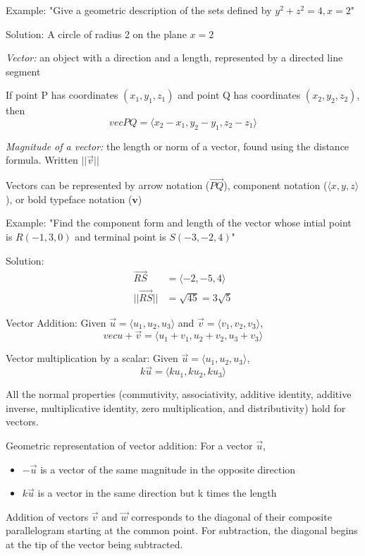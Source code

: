 \documentclass[12pt]{article}
\begin{document}
Example:
"Give a geometric description of the sets defined by $y^2 + z^2 = 4, x = 2$"

Solution:
A circle of radius 2 on the plane $x = 2$

\emph{Vector:} an object with a direction and a length, represented by a directed line segment

If point P has coordinates $(x_1, y_1, z_1)$ and point Q has coordinates $(x_2, y_2, z_2)$, then 
\[vec{PQ} = \langle x_2 - x_1, y_2 - y_1, z_2 - z_1 \rangle\]

\emph{Magnitude of a vector:} the length or norm of a vector, found using the distance formula. Written $||\vec{v}||$

Vectors can be represented by arrow notation ($\vec{PQ}$), component notation ($\langle x, y, z\rangle$), or bold typeface notation ($\mathbf{v}$)

Example:
"Find the component form and length of the vector whose intial point is $R(-1, 3, 0)$ and terminal point is $S(-3, -2, 4)$"

Solution:
\begin{align*}
    \vec{RS} &= \langle -2, -5, 4\rangle\\
    ||\vec{RS}|| &= \sqrt{45} = 3\sqrt{5}
\end{align*}

Vector Addition:
Given $\vec{u} = \langle u_1, u_2, u_3\rangle$ and $\vec{v} = \langle v_1, v_2, v_3\rangle$,
\[vec{u} + \vec{v} = \langle u_1 + v_1, u_2 + v_2, u_3 + v_3\rangle\]

Vector multiplication by a scalar:
Given $\vec{u} = \langle u_1, u_2, u_3\rangle$, 
\[k\vec{u} = \langle ku_1, ku_2, ku_3\rangle\]

All the normal properties (commutivity, associativity, additive identity, additive inverse, multiplicative identity, zero multiplication, and distributivity) hold for vectors.

Geometric representation of vector addition:
For a vector $\vec{u}$, 
\begin{itemize}
    \item $-\vec{u}$ is a vector of the same magnitude in the opposite direction
    \item $k\vec{u}$ is a vector in the same direction but k times the length
\end{itemize}

Addition of vectors $\vec{v}$ and $\vec{w}$ corresponds to the diagonal of their composite parallelogram starting at the common point. For subtraction, the diagonal begins at the tip of the vector being subtracted. 
\end{document}
